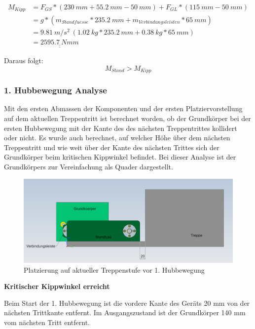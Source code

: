\begin{align*}
    M_{Kipp}  &= F_{GS} * (230\ mm + 55.2\ mm - 50\ mm) + F_{GL} * (115\ mm - 50\ mm) \\
    &= g * (m_{Standfuesse} * 235.2\ mm + m_{Verbindungsleisten} * 65\ mm) \\
    &= 9.81\ m/s^2\ (1.02\ kg * 235.2\ mm + 0.38\ kg * 65\ mm) \\
    &= \underline{\underline{2595.7\ Nmm}}
\end{align*}
  
Daraus folgt:
\[M_{Stand} > M_{Kipp}\]

\subsubsection{1. Hubbewegung Analyse}
\label{HubbewegungAnalyse}

Mit den ersten Abmassen der Komponenten und der ersten Platziervorstellung auf dem aktuellen Treppentritt ist berechnet worden, ob der Grundkörper bei der ersten Hubbewegung mit der Kante des des nächsten Treppentrittes kollidert oder nicht. Es wurde auch berechnet, auf welcher Höhe über dem nächsten Treppentritt und wie weit über der Kante des nächsten Trittes sich der Grundkörper beim kritischen Kippwinkel befindet. Bei dieser Analyse ist der Grundkörpers zur Vereinfachung als Quader dargestellt.

\begin{figure}[H]
  \includegraphics[width=1\textwidth]{img/Treppensteigen/Platzierung auf Treppe.PNG}
  \centering
  \caption{Platzierung auf aktueller Treppenstufe vor 1. Hubbewegung}
\end{figure}

\textbf{Kritischer Kippwinkel erreicht}

Beim Start der 1. Hubbewegung ist die vordere Kante des Geräts 20 mm von der nächsten Trittkante entfernt. Im Ausgangszustand ist der Grundkörper 140 mm vom nächsten Tritt entfernt.\\

